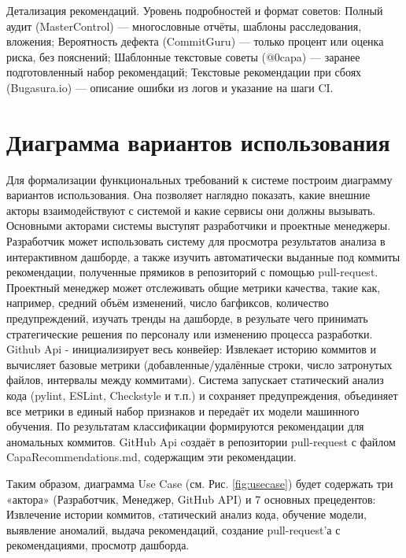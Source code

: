 Детализация рекомендаций. Уровень подробностей и формат советов: Полный аудит (MasterControl) — многословные отчёты, шаблоны расследования, вложения; Вероятность дефекта (CommitGuru) — только процент или оценка риска, без пояснений; Шаблонные текстовые советы (@0capa) — заранее подготовленный набор рекомендаций; Текстовые рекомендации при сбоях (Bugasura.io) — описание ошибки из логов и указание на шаги CI.



\section{Диаграмма вариантов использования} \label{ch1:sec5}
Для формализации функциональных требований к системе построим диаграмму вариантов использования. Она позволяет наглядно показать, какие внешние акторы взаимодействуют с системой и какие сервисы они должны вызывать.
Основными акторами системы выступят разработчики и проектные менеджеры.
Разработчик может использовать систему для просмотра результатов анализа в интерактивном дашборде, а также изучить автоматически выданные под коммиты рекомендации, полученные прямиков в репозиторий с помощью pull-request.
Проектный менеджер может отслеживать общие метрики качества, такие как, например, средний объём изменений, число багфиксов, количество предупреждений, изучать тренды на дашборде, в резульате чего принимать стратегические решения по персоналу или изменению процесса разработки. Github Api - инициализирует весь конвейер: Извлекает историю коммитов и вычисляет базовые метрики (добавленные/удалённые строки, число затронутых файлов, интервалы между коммитами). Система запускает статический анализ кода (pylint, ESLint, Checkstyle и т.п.) и сохраняет предупреждения, объединяет все метрики в единый набор признаков и передаёт их модели машинного обучения. По результатам классификации формируются рекомендации для аномальных коммитов. GitHub Api cоздаёт в репозитории pull-request с файлом CapaRecommendations.md, содержащим эти рекомендации.

Таким образом, диаграмма Use Case (см. Рис. \ref{fig:usecase}) будет содержать три «актора» (Разработчик, Менеджер, GitHub API) и 7 основных прецедентов: Извлечение истории коммитов, cтатический анализ кода, обучение модели, выявление аномалий, выдача рекомендаций, создание pull-request’а с рекомендациями, просмотр дашборда.

